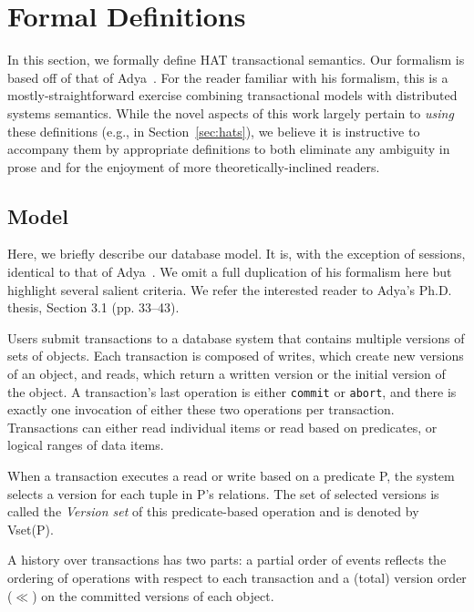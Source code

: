 
\normalsize

\section{Formal Definitions}

In this section, we formally define HAT transactional semantics. Our
formalism is based off of that of Adya~\cite{adya}. For the reader
familiar with his formalism, this is a mostly-straightforward exercise
combining transactional models with distributed systems
semantics. While the novel aspects of this work largely pertain
to \textit{using} these definitions (e.g., in Section~\ref{sec:hats}),
we believe it is instructive to accompany them by appropriate
definitions to both eliminate any ambiguity in prose and for the
enjoyment of more theoretically-inclined readers.

\subsection{Model}

Here, we briefly describe our database model. It is, with the
exception of sessions, identical to that of Adya~\cite{adya}. We omit
a full duplication of his formalism here but highlight several salient
criteria. We refer the interested reader to Adya's Ph.D. thesis,
Section 3.1 (pp. 33--43).

Users submit transactions to a database system that contains multiple
versions of sets of objects. Each transaction is composed of writes,
which create new versions of an object, and reads, which return a
written version or the initial version of the object. A transaction's
last operation is either \texttt{commit} or \texttt{abort}, and there
is exactly one invocation of either these two operations per
transaction. Transactions can either read individual items or read
based on predicates, or logical ranges of data items.

\begin{definition}
When a transaction executes a read or write based on a predicate P,
the system selects a version for each tuple in P’s relations. The set
of selected versions is called the \textit{Version set} of this predicate-based
operation and is denoted by Vset(P).
\end{definition}

A history over transactions has two parts: a partial order of events
reflects the ordering of operations with respect to each transaction
and a (total) version order ($\ll$) on the committed versions of each
object.

